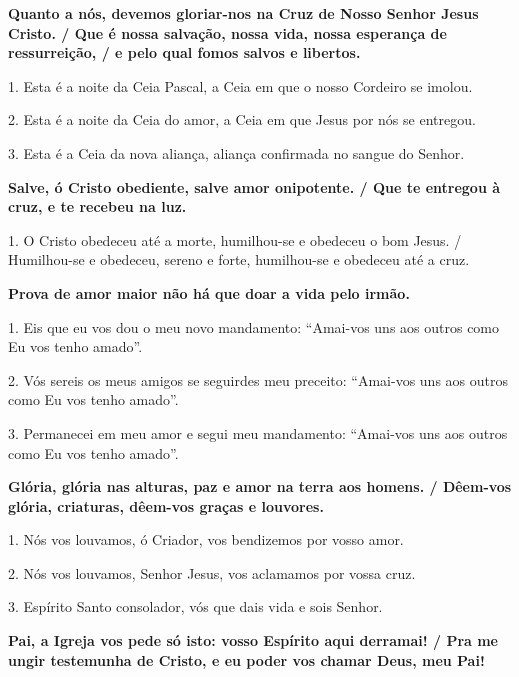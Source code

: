 \documentclass[a5paper,9pt]{extarticle}
\begin{document}
\begin{cantos}
\begin{canto}
\textbf{Quanto a nós, devemos gloriar-nos na Cruz de Nosso Senhor Jesus Cristo. / Que é nossa salvação, nossa vida, nossa esperança de ressurreição, / e pelo qual fomos salvos e libertos.}

1. Esta é a noite da Ceia Pascal, a Ceia em que o nosso Cordeiro se imolou.

2. Esta é a noite da Ceia do amor, a Ceia em que Jesus por nós se entregou.

3. Esta é a Ceia da nova aliança, aliança confirmada no sangue do Senhor.
\end{canto}

\begin{canto}
\textbf{Salve, ó Cristo obediente, salve amor onipotente. / Que te entregou à cruz, e te recebeu na luz.}

1. O Cristo obedeceu até a morte, humilhou-se e obedeceu o bom Jesus. / Humilhou-se e obedeceu, sereno e forte, humilhou-se e obedeceu até a cruz.
\end{canto}

\begin{canto}
\textbf{Prova de amor maior não há que doar a vida pelo irmão. }

1. Eis que eu vos dou o meu novo mandamento: ``Amai-vos uns aos outros como Eu vos tenho amado''.

2. Vós sereis os meus amigos se seguirdes meu preceito: ``Amai-vos uns aos outros como Eu vos tenho amado''.

3. Permanecei em meu amor e segui meu mandamento: ``Amai-vos uns aos outros como Eu vos tenho amado''.
\end{canto}

\begin{canto}
\textbf{Glória, glória nas alturas, paz e amor na terra aos homens. / Dêem-vos glória, criaturas, dêem-vos graças e louvores.}

1. Nós vos louvamos, ó Criador, vos bendizemos por vosso amor.

2. Nós vos louvamos, Senhor Jesus, vos aclamamos por vossa cruz.

3. Espírito Santo consolador, vós que dais vida e sois Senhor.
\end{canto}

\begin{canto}
\textbf{Pai, a Igreja vos pede só isto: vosso Espírito aqui derramai! / Pra me ungir testemunha de Cristo, e eu poder vos chamar Deus, meu Pai!}


\end{canto}
\end{cantos}
\end{document}
